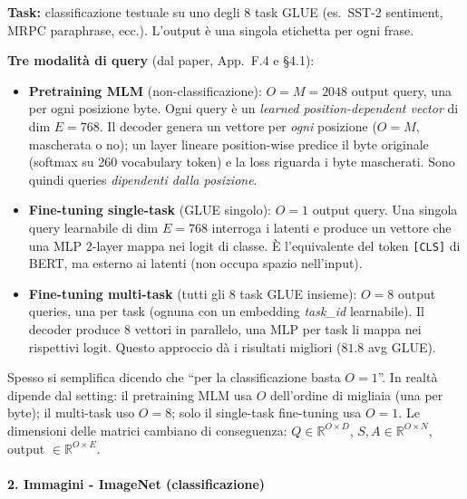 \documentclass[
  11pt,
]{article}
\begin{document}
\textbf{Task:} classificazione testuale su uno degli 8 task GLUE (es.\ SST-2 sentiment, MRPC paraphrase, ecc.). L'output è una singola etichetta per ogni frase.

\textbf{Tre modalità di query} (dal paper, App.\ F.4 e \S4.1):

\begin{itemize}\setlength\itemsep{0.4em}
\item \textbf{Pretraining MLM} (non-classificazione): $O = M = 2048$ output query, una per ogni posizione byte. Ogni query è un \emph{learned position-dependent vector} di dim $E = 768$. Il decoder genera un vettore per \emph{ogni} posizione ($O = M$, mascherata o no); un layer lineare position-wise predice il byte originale (softmax su 260 vocabulary token) e la loss riguarda i byte mascherati. Sono quindi queries \emph{dipendenti dalla posizione}.

\item \textbf{Fine-tuning single-task} (GLUE singolo): $O = 1$ output query. Una singola query learnabile di dim $E = 768$ interroga i latenti e produce un vettore che una MLP 2-layer mappa nei logit di classe. È l'equivalente del token \texttt{[CLS]} di BERT, ma esterno ai latenti (non occupa spazio nell'input).

\item \textbf{Fine-tuning multi-task} (tutti gli 8 task GLUE insieme): $O = 8$ output queries, una per task (ognuna con un embedding \emph{task\_id} learnabile). Il decoder produce 8 vettori in parallelo, una MLP per task li mappa nei rispettivi logit. Questo approccio dà i risultati migliori ($81.8$ avg GLUE).
\end{itemize}

\begin{notabox}[title={\textbf{``1 query = 1 output'' --- non sempre!}}]
Spesso si semplifica dicendo che ``per la classificazione basta $O=1$''. In realtà dipende dal setting: il pretraining MLM usa $O$ dell'ordine di migliaia (una per byte); il multi-task uso $O = 8$; solo il single-task fine-tuning usa $O = 1$. Le dimensioni delle matrici cambiano di conseguenza: $Q \in \mathbb{R}^{O \times D}$, $S, A \in \mathbb{R}^{O \times N}$, output $\in \mathbb{R}^{O \times E}$.
\end{notabox}

\paragraph{2. \textbf{Immagini - ImageNet (classificazione)}}
\end{document}
